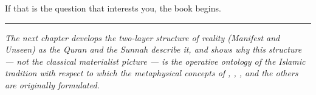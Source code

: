 If that is the question that interests you, the book begins.

\vspace{1em}
\hrule
\vspace{0.5em}
\noindent\textit{The next chapter develops the two-layer structure of
reality (Manifest and Unseen) as the Quran and the Sunnah describe it,
and shows why this structure --- not the classical materialist picture ---
is the operative ontology of the Islamic tradition with respect to
which the metaphysical concepts of , ,
, and the others are originally formulated.}
